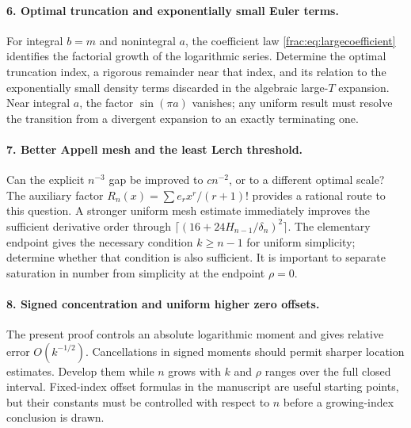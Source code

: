 \paragraph{6. Optimal truncation and exponentially small Euler terms.}
For integral $b=m$ and nonintegral $a$, the coefficient law
\eqref{frac:eq:largecoefficient} identifies the factorial growth
of the logarithmic series. Determine the optimal truncation index,
a rigorous remainder near that index, and its relation to the
exponentially small density terms discarded in the algebraic
large-$T$ expansion. Near integral $a$, the factor $\sin(\pi a)$
vanishes; any uniform result must resolve the transition from a
divergent expansion to an exactly terminating one.

\paragraph{7. Better Appell mesh and the least Lerch threshold.}
Can the explicit $n^{-3}$ gap be improved to $cn^{-2}$, or to
a different optimal scale? The auxiliary factor
$R_n(x)=\sum e_r x^r/(r+1)!$ provides a rational route to this
question. A stronger uniform mesh estimate immediately improves
the sufficient derivative order through
$\lceil(16+24H_{n-1}/\delta_n)^2\rceil$.
The elementary endpoint gives the necessary condition
$k\ge n-1$ for uniform simplicity; determine whether that condition
is also sufficient. It is important to separate saturation in
number from simplicity at the endpoint $\rho=0$.

\paragraph{8. Signed concentration and uniform higher zero offsets.}
The present proof controls an absolute logarithmic moment and gives
relative error $O(k^{-1/2})$. Cancellations in signed moments should
permit sharper location estimates. Develop them while $n$ grows
with $k$ and $\rho$ ranges over the full closed interval. Fixed-index
offset formulas in the manuscript are useful starting points, but
their constants must be controlled with respect to $n$ before a
growing-index conclusion is drawn.

